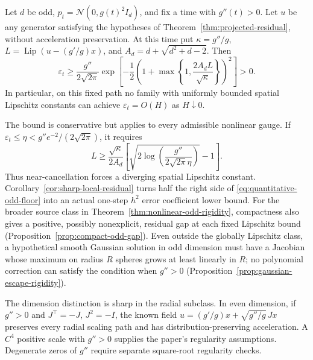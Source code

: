 \begin{theorem}
\label{thm:quantitative-odd-floor}
Let $d$ be odd, $p_t=\mathcal N(0,g(t)^2I_d)$, and fix a time with
$g''(t)>0$.  Let $u$ be any generator satisfying the hypotheses of
Theorem~\ref{thm:projected-residual}, without acceleration preservation.
At this time put $\kappa=g''/g$, $L=\operatorname{Lip}(u-(g'/g)x)$, and
$A_d=d+\sqrt{d^2+d-2}$.  Then
\begin{equation}
 \varepsilon_t\ge
 \frac{g''}{2\sqrt{2\pi}}
 \exp\!\left[-\frac12
       \left(1+\max\!\left\{1,\frac{2A_dL}{\sqrt\kappa}\right\}\right)^2
      \right]>0.
 \label{eq:quantitative-odd-floor}
\end{equation}
In particular, on this fixed path no family with uniformly bounded
spatial Lipschitz constants can achieve $\varepsilon_t=O(H)$ as
$H\downarrow0$.
\end{theorem}

The bound is conservative but applies to every admissible nonlinear
gauge.  If $\varepsilon_t\le\eta<g''e^{-2}/(2\sqrt{2\pi})$, it requires
\begin{equation}
 L\ge\frac{\sqrt\kappa}{2A_d}
 \left[\sqrt{2\log\!\left(\frac{g''}{2\sqrt{2\pi}\eta}\right)}-1\right].
 \label{eq:odd-regularity-cost}
\end{equation}
Thus near-cancellation forces a diverging spatial Lipschitz constant.
Corollary~\ref{cor:sharp-local-residual} turns half the right side of
\eqref{eq:quantitative-odd-floor} into an actual one-step $h^2$ error
coefficient lower bound.  For the broader source class in
Theorem~\ref{thm:nonlinear-odd-rigidity}, compactness also gives a positive,
possibly nonexplicit, residual gap at each fixed Lipschitz bound
(Proposition~\ref{prop:compact-odd-gap}).
Even outside the globally Lipschitz class, a hypothetical smooth Gaussian
solution in odd dimension must have a Jacobian whose maximum on radius
$R$ spheres grows at least linearly in $R$; no polynomial correction can
satisfy the condition when $g''>0$
(Proposition~\ref{prop:gaussian-escape-rigidity}).

The dimension distinction is sharp in the radial subclass.  In even
dimension, if $g''>0$ and $J^\top=-J$, $J^2=-I$, the known field
$u=(g'/g)x+\sqrt{g''/g}\,Jx$ preserves every radial scaling path and has
distribution-preserving acceleration.  A $C^4$ positive scale with
$g''>0$ supplies the paper's regularity assumptions.  Degenerate zeros
of $g''$ require separate square-root regularity checks.

